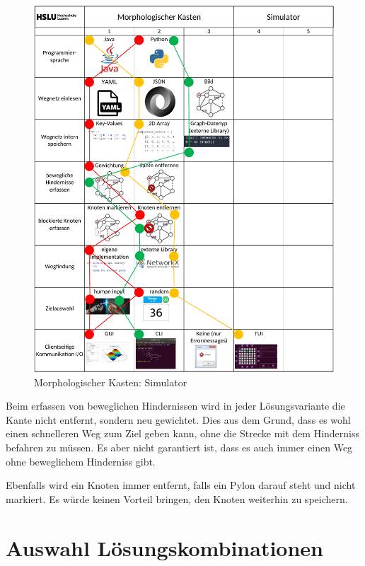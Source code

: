 \begin{figure}[H]
\centering
\includegraphics[width=\textwidth]{assets/MK_Simulator.pdf}
\caption{Morphologischer Kasten: Simulator}
\label{fig:mk-simulator}
\end{figure}



Beim erfassen von beweglichen Hindernissen wird in jeder Lösungsvariante die Kante nicht entfernt, sondern neu gewichtet. Dies aus dem Grund, dass es wohl einen schnelleren Weg zum Ziel geben kann, ohne die Strecke mit dem Hinderniss befahren zu müssen. Es aber nicht garantiert ist, dass es auch immer einen Weg ohne beweglichem Hinderniss gibt.

Ebenfalls wird ein Knoten immer entfernt, falls ein Pylon darauf steht und nicht markiert. Es würde keinen Vorteil bringen, den Knoten weiterhin zu speichern.


\newpage
\section{Auswahl Lösungskombinationen}

